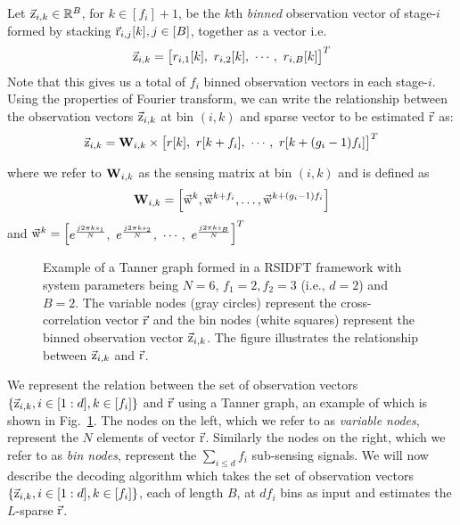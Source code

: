 	 Let $\vec{\mathrm{z}}_{i,k}\in\mathbb{R}^{B}$, for $k\in [f_i]+1$, be the $k$th \textit{binned} observation vector of stage-$i$ formed by stacking $\vec{\mathrm{r}}_{i,j}[k], j\in[B]$, together as a vector i.e.
\[
	  \vec{\mathrm{z}}_{i,k} = \begin{bmatrix}
	 r_{i,1}[k],~ 
	 r_{i,2}[k],~ 
	 \cdots,~
	 r_{i,B}[k]
	 \end{bmatrix}^{T}
\]
Note that this gives us a total of $f_i$ binned observation vectors in each stage-$i$. Using the properties of Fourier transform, we can write the relationship between the observation vectors $\vec{\mathrm{z}}_{i,k}$ at bin $(i,k)$ and sparse vector to be estimated $\vec{\mathrm{r}}$ as: 
\begin{align}
	\label{Eqn:Generator Equation}
	\vec{\mathrm{z}}_{i,k}= \mathbf{W}_{i,k} \times
	\begin{bmatrix}
		r[k],~
		r[k+f_i],~
		\cdots,~
		r[k+(g_i-1)f_i]
	\end{bmatrix}^{T}
\end{align}

where we refer to $\mathbf{W}_{i,k}$ as the sensing matrix at bin $(i,k)$ and is defined as
\begin{align}\label{Eqn:Sensing Matrix}
	\mathbf{W}_{i,k} = \left[\vec{\mathrm{w}}^{k},\vec{\mathrm{w}}^{k+f_i},\ldots, \vec{\mathrm{w}}^{k+(g_i-1)f_i}\right]
\end{align} and
 $\vec{\mathrm{w}}^{k}=
	\begin{bmatrix}
		e^{\frac{j2\pi ks_1}{N}}, ~
		e^{\frac{j2\pi ks_2}{N}},~
		\cdots,~
		e^{\frac{j2\pi ks_B}{N}}
	\end{bmatrix}^{T}$

\begin{figure}[h!]
	\begin{center}
	 	\resizebox{0.40\textwidth}{!}{}	
	\end{center}	
	\caption{Example of a Tanner graph formed in a RSIDFT framework with system parameters being $N=6$, $f_1=2, f_2=3$ (i.e., $d=2$) and $B=2$. The variable nodes (gray circles) represent the cross-correlation vector $\vec{\mathrm{r}}$ and the bin nodes (white squares) represent the binned observation vector $\vec{\mathrm{z}}_{i,k}$. The figure illustrates the relationship between $\vec{\mathrm{z}}_{i,k}$ and $\vec{\mathrm{r}}$.}\label{fig:factorgraph}
	\vspace{5 pt}
\end{figure}
 
We represent the relation between the set of observation vectors $\{\vec{\mathrm{z}}_{i,k},i\in[1:d],k\in[f_i]\}$ and $\vec{\mathrm{r}}$ using a Tanner graph, an example of which is shown in Fig.~\ref{fig:factorgraph}. The nodes on the left, which we refer to as {\it variable nodes}, represent the $N$ elements of vector $\vec{\mathrm{r}}$. Similarly the nodes on the right, which we refer to as {\it bin nodes}, represent the $\sum_{i\leq d} f_i$ sub-sensing signals. We will now describe the decoding algorithm which takes the set of observation vectors $\{\vec{\mathrm{z}}_{i,k},i\in[1:d],k\in[f_i]\}$, each of length $B$, at $df_i$ bins as input and estimates the $L$-sparse $\vec{\mathrm{r}}$.	

